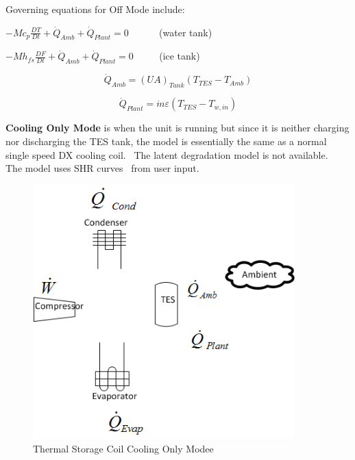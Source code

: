 Governing equations for Off Mode include:

\(- M{c_p}\frac{{DT}}{{Dt}} + {\dot Q_{Amb}} + {\dot Q_{Plant}} = 0\) ~~~~~ (water tank)

\(- M{h_{fs}}\frac{{DF}}{{Dt}} + {\dot Q_{Amb}} + {\dot Q_{Plant}} = 0\) ~~~~ (ice tank)

\begin{equation}
{\dot Q_{Amb}} = {\left( {UA} \right)_{Tank}}\left( {{T_{TES}} - {T_{Amb}}} \right)
\end{equation}

\begin{equation}
{\dot Q_{Plant}} = \dot m\varepsilon \left( {{T_{TES}} - {T_{w,in}}} \right)
\end{equation}

\textbf{Cooling Only Mode} is when the unit is running but since it is neither charging nor discharging the TES tank, the model is essentially the same as a normal single speed DX cooling coil.~ The latent degradation model is not available.~ The model uses SHR curves~ from user input.

\begin{figure}[hbtp] %
\centering
\includegraphics[width=0.9\textwidth, height=0.9\textheight, keepaspectratio=true]{media/image4293.png}
\caption{Thermal Storage Coil Cooling Only Modee \protect \label{fig:thermal-storage-coil-cooling-only-modee}}
\end{figure}

